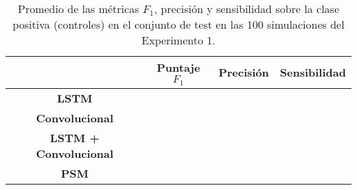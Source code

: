 \begin{table}[H]
    \centering
    \renewcommand{\arraystretch}{1.2}
    \begin{tabular}{|c|c|c|c|}
        \hline
         & \textbf{Puntaje} \(F_1\) & \textbf{Precisión} & \textbf{Sensibilidad} \\ \hline\hline
        \textbf{LSTM}
            &  &  &  \\ \hline
        \textbf{Convolucional}
            &  &  &  \\ \hline
        \textbf{LSTM + Convolucional}
            &  &  &  \\ \hline
        \textbf{PSM}
            & &  &  \\
        \hline
    \end{tabular}
    \caption{Promedio de las métricas \(F_1\), precisión y sensibilidad sobre la
    clase positiva (controles) en el conjunto de test en las 100 simulaciones del
    Experimento 1.}
    \label{tab:results_exp1}
\end{table}